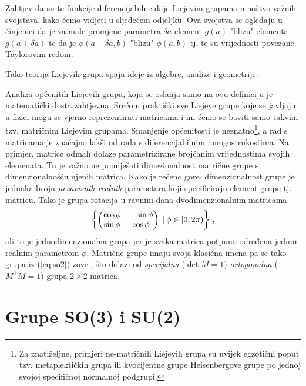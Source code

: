 Zahtjev da su te funkcije diferencijabilne daje Liejevim grupama mnoštvo važnih svojstava,
kako ćemo vidjeti u sljedećem odjeljku.
Ova svojstva se ogledaju
u činjenici da je za male promjene parametra $\delta a$
element $g(a)$ "blizu" elementa $g(a+\delta a)$ te
da je $\phi(a+\delta a, b)$
"blizu" $\phi(a,b)$ tj. te su vrijednosti povezane Taylorovim redom.\\
\centerline{}
Tako teorija Liejevih grupa spaja ideje iz algebre, analize i geometrije.

Analiza općenitih Liejevih grupa, koja se oslanja samo na ovu definiciju
je matematički dosta zahtjevna. Srećom praktički sve Liejeve grupe koje se javljaju
u fizici mogu se vjerno reprezentirati matricama i mi ćemo se baviti
samo takvim tzv. matričnim Liejevim grupama. Smanjenje općenitosti je neznatno\footnote{Za
    znatiželjne, primjeri ne-matričnih Liejevih grupa su uvijek egzotični
    poput tzv. metaplektičkih grupa ili kvocijentne grupe Heisenbergove grupe po
jednoj svojoj specifičnoj normalnoj podgrupi.\label{fus:nematricne}},
a rad s matricama je značajno lakši od rada s diferencijabilnim mnogostrukostima.
Na primjer, matrice odmah dolaze parametrizirane brojčanim vrijednostima svojih
elemenata. Tu je važno
ne pomiješati dimezionalnost matrične grupe s dimenzionalnošću njenih matrica.
Kako je rečeno gore, dimenzionalnost grupe je jednaka broju \emph{nezavisnih realnih}
parametara koji specificiraju element grupe tj. matricu. Tako je grupa rotacija
u ravnini dana dvodimenzionalnim matricama
\begin{equation}
    \left\{ \begin{pmatrix}
        \cos\phi & -\sin\phi \\
        \sin\phi & \cos\phi 
    \end{pmatrix} 
     \: | \: \phi \in [0, 2\pi) \right\} \,,
    \label{eq:so2}
\end{equation}
ali to je jednodimenzionalna grupa jer je svaka matrica potpuno određena
jednim realnim parametrom $\phi$. Matrične grupe imaju svoja klasična
imena pa se tako grupa iz (\ref{eq:so2}) zove , što dolazi
od \emph{specijalna} ($\det M = 1$) 
\emph{ortogonalna} ($M^\mathsf{T} M = 1$) grupa $2\times 2$ matrica. 

\section{Grupe SO(3) i SU(2)}
\label{sec:so3su2}

